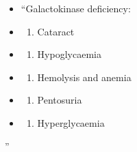 \documentclass[
]{book}
\providecommand{\tightlist}{%
  \setlength{\itemsep}{0pt}\setlength{\parskip}{0pt}}
\begin{document}
\begin{itemize}
\item
  ``Galactokinase deficiency:
\item
  \begin{enumerate}
  \def\labelenumi{(\Alph{enumi})}
  \tightlist
  \item
    Cataract\\
  \end{enumerate}
\item
  \begin{enumerate}
  \def\labelenumi{(\Alph{enumi})}
  \setcounter{enumi}{1}
  \tightlist
  \item
    Hypoglycaemia\\
  \end{enumerate}
\item
  \begin{enumerate}
  \def\labelenumi{(\Alph{enumi})}
  \setcounter{enumi}{2}
  \tightlist
  \item
    Hemolysis and anemia\\
  \end{enumerate}
\item
  \begin{enumerate}
  \def\labelenumi{(\Alph{enumi})}
  \setcounter{enumi}{3}
  \tightlist
  \item
    Pentosuria\\
  \end{enumerate}
\item
  \begin{enumerate}
  \def\labelenumi{(\Alph{enumi})}
  \setcounter{enumi}{4}
  \tightlist
  \item
    Hyperglycaemia
  \end{enumerate}
\end{itemize}

''
\end{document}
